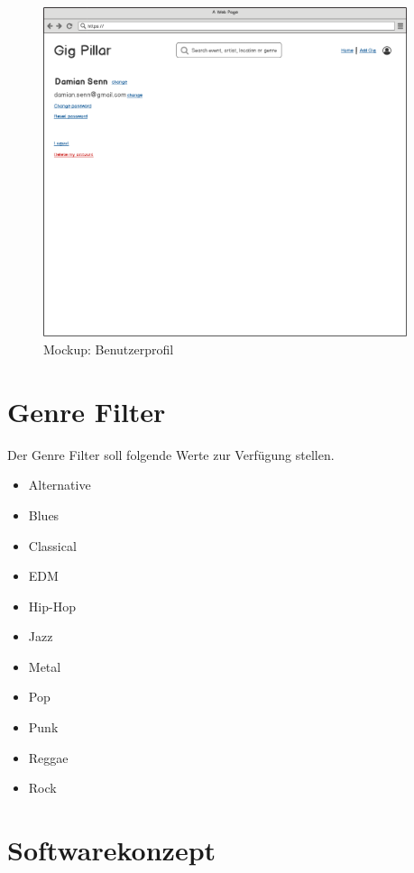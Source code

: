 \begin{figure}[!htb]
  \centering
  \includegraphics[width=0.95\textwidth]{mockups/profile.png}
  \caption{Mockup: Benutzerprofil}
\end{figure}

\clearpage
\section{Genre Filter}\label{genrefilter}

Der Genre Filter soll folgende Werte zur Verfügung stellen.

\begin{itemize}
  \item{} Alternative
  \item{} Blues
  \item{} Classical
  \item{} EDM
  \item{} Hip-Hop
  \item{} Jazz
  \item{} Metal
  \item{} Pop
  \item{} Punk
  \item{} Reggae
  \item{} Rock
\end{itemize}

\clearpage
\section{Softwarekonzept}\label{softwarekonzept}

